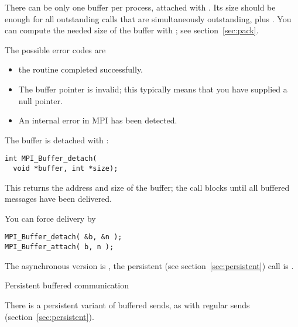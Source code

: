 There can be only one buffer per process, attached with
.
%
Its size should be enough
for all outstanding  calls that are simultaneously
outstanding, plus .
You can compute the needed size of the buffer with ;
see section~\ref{sec:pack}.

The possible error codes are
\begin{itemize}
\item {} the routine completed successfully.
\item {} The buffer pointer is invalid;
  this typically means that you have supplied a null pointer.
\item {} An internal error in MPI has been detected.
\end{itemize}

The buffer is detached with :
\begin{lstlisting}
int MPI_Buffer_detach(
  void *buffer, int *size);
\end{lstlisting}
This returns the address and size of the buffer; the call blocks
until all buffered messages have been delivered.

You can force delivery by
\begin{lstlisting}
MPI_Buffer_detach( &b, &n );
MPI_Buffer_attach( b, n );
\end{lstlisting}

The asynchronous version is , the persistent
(see section~\ref{sec:persistent}) call is .

 {Persistent buffered communication}

There is a persistent variant 
of buffered sends, as with regular
sends (section~\ref{sec:persistent}).


